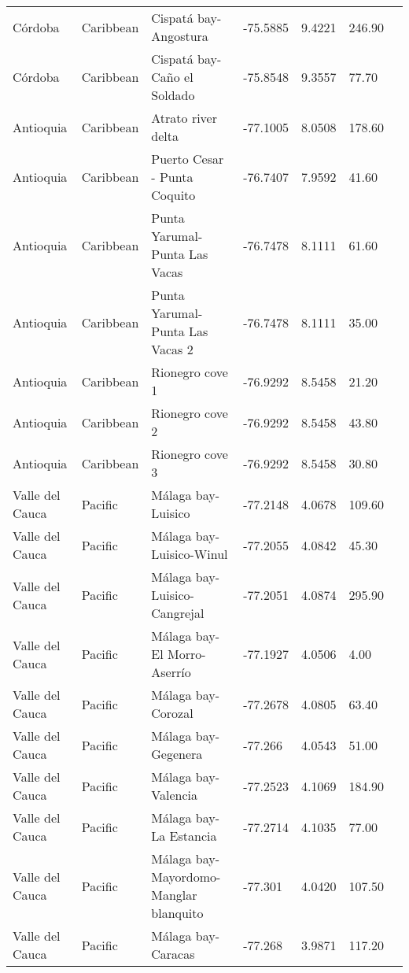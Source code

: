 \documentclass[review, authoryear]{elsarticle}   	%
\begin{document}
\begin{table}[htbp]
\begin{tabular}{p{2.0cm}p{2.0cm}p{4.0cm}p{1.0cm}p{1.0cm}p{2.0cm}p{2.5cm}}
C\'{o}rdoba&Caribbean&Cispat\'{a} bay-Angostura&-75.5885&9.4221&246.90&\citet{Bolivar_inpreparation}\\ 
C\'{o}rdoba&Caribbean&Cispat\'{a} bay-Ca\~{n}o el Soldado&-75.8548&9.3557&77.70&\citet{Bolivar_inpreparation}\\ 
Antioquia&Caribbean&Atrato river delta&-77.1005&8.0508&178.60&\citet{Blanco2012}\\ 
Antioquia&Caribbean&Puerto Cesar - Punta Coquito&-76.7407&7.9592&41.60&\citet{Blanco2012}\\ 
Antioquia&Caribbean&Punta Yarumal-Punta Las Vacas&-76.7478&8.1111&61.60&\citet{Blanco2012}\\ 
Antioquia&Caribbean&Punta Yarumal-Punta Las Vacas 2&-76.7478&8.1111&35.00&\citet{Blanco2012}\\ 
Antioquia&Caribbean&Rionegro cove 1&-76.9292&8.5458&21.20&\citet{Blanco2012}\\ 
Antioquia&Caribbean&Rionegro cove 2&-76.9292&8.5458&43.80&\citet{Blanco2012}\\ 
Antioquia&Caribbean&Rionegro cove 3&-76.9292&8.5458&30.80&\citet{Blanco2012}\\ 
Valle del Cauca&Pacific&M\'{a}laga bay-Luisico&-77.2148&4.0678&109.60&\citet{Malaga2015}\\ 
Valle del Cauca&Pacific&M\'{a}laga bay-Luisico-Winul&-77.2055&4.0842&45.30&\citet{Malaga2015}\\ 
Valle del Cauca&Pacific&M\'{a}laga bay-Luisico-Cangrejal&-77.2051&4.0874&295.90&\citet{Malaga2015}\\ 
Valle del Cauca&Pacific&M\'{a}laga bay-El Morro-Aserr\'{i}o&-77.1927&4.0506&4.00&\citet{Malaga2015}\\ 
Valle del Cauca&Pacific&M\'{a}laga bay-Corozal&-77.2678&4.0805&63.40&\citet{Malaga2015}\\ 
Valle del Cauca&Pacific&M\'{a}laga bay-Gegenera&-77.266&4.0543&51.00&\citet{Malaga2015}\\ 
Valle del Cauca&Pacific&M\'{a}laga bay-Valencia&-77.2523&4.1069&184.90&\citet{Malaga2015}\\ 
Valle del Cauca&Pacific&M\'{a}laga bay-La Estancia&-77.2714&4.1035&77.00&\citet{Malaga2015}\\ 
Valle del Cauca&Pacific&M\'{a}laga bay-Mayordomo-Manglar blanquito&-77.301&4.0420&107.50&\citet{Malaga2015}\\ 
Valle del Cauca&Pacific&M\'{a}laga bay-Caracas&-77.268&3.9871&117.20&\citet{Malaga2015}\\ 
     
               \bottomrule
   \end{tabular}
   \label{tab:SourceAGB}
\end{table}
\end{document}
